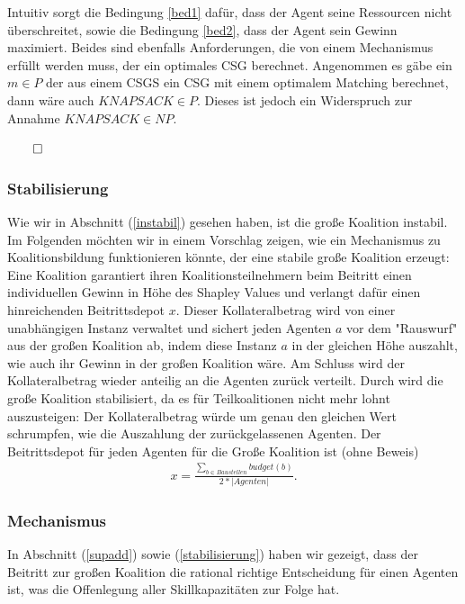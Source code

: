 Intuitiv sorgt die Bedingung \ref{bed1} dafür, dass der Agent seine Ressourcen nicht überschreitet, sowie die Bedingung \ref{bed2}, dass der Agent sein Gewinn maximiert. Beides sind ebenfalls Anforderungen, die von einem Mechanismus erfüllt werden muss, der ein optimales CSG berechnet.
Angenommen es gäbe ein $m\in P$ der aus einem CSGS ein CSG mit einem optimalem Matching berechnet, dann wäre auch $KNAPSACK \in P$. Dieses ist jedoch ein Widerspruch zur Annahme $KNAPSACK \in NP$.
\begin{flushright}
  $\qed$
\end{flushright}

\subsubsection*{Stabilisierung}
\label{stabilisierung}
Wie wir in Abschnitt (\ref{instabil}) gesehen haben, ist die große Koalition instabil. Im Folgenden möchten wir in einem Vorschlag zeigen, wie ein Mechanismus zu Koalitionsbildung funktionieren könnte, der eine stabile große Koalition erzeugt:
Eine Koalition garantiert ihren Koalitionsteilnehmern beim Beitritt einen individuellen Gewinn in Höhe des Shapley Values und verlangt dafür einen hinreichenden Beitrittsdepot $x$. Dieser Kollateralbetrag wird von einer unabhängigen Instanz verwaltet und sichert jeden Agenten $a$ vor dem "Rauswurf" aus der großen Koalition ab, indem diese Instanz $a$ in der gleichen Höhe auszahlt, wie auch ihr Gewinn in der großen Koalition wäre.
Am Schluss wird der Kollateralbetrag wieder anteilig an die Agenten zurück verteilt. Durch wird die große Koalition stabilisiert, da es für Teilkoalitionen nicht mehr lohnt auszusteigen: Der Kollateralbetrag würde um genau den gleichen Wert schrumpfen, wie die Auszahlung der zurückgelassenen Agenten. Der Beitrittsdepot für jeden Agenten für die Große Koalition ist (ohne Beweis)
\begin{align}
  x=\frac{\sum_{b\in Baustellen} budget(b)}{2*|Agenten|}.
\end{align}

\subsubsection*{Mechanismus}
In Abschnitt (\ref{supadd}) sowie (\ref{stabilisierung}) haben wir gezeigt, dass der Beitritt zur großen Koalition die rational richtige Entscheidung für einen Agenten ist, was die Offenlegung aller Skillkapazitäten zur Folge hat.

